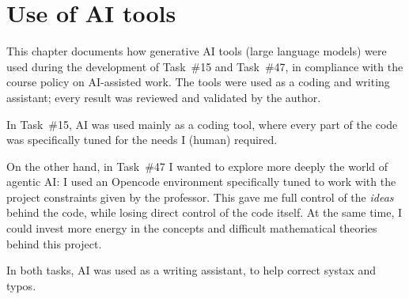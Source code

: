 \chapter{Use of AI tools}

This chapter documents how generative AI tools (large language models) were used during the development of
Task~\#15 and Task~\#47, in compliance with the course policy on AI-assisted work. The tools were used as a coding and
writing assistant; every result was reviewed and validated by the author.

\noindent In Task~\#15, AI was used mainly as a coding tool, where every part of the code was specifically tuned
for the needs I (human) required. 

\noindent On the other hand, in Task~\#47 I wanted to explore more deeply the world of agentic AI: I used an Opencode
environment specifically tuned to work with the project constraints given by the professor. This gave me full control
of the \emph{ideas} behind the code, while losing direct control of the code itself. At the same time, I could
invest more energy in the concepts and difficult mathematical theories behind this project.

\noindent In both tasks, AI was used as a writing assistant, to help correct systax and typos. 
\newpage
